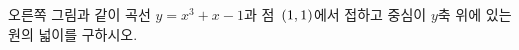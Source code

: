 \noindent\begin{minipage}[t]{0.58\linewidth}\vspace{0pt}\raggedright 오른쪽 그림과 같이 곡선 $y=x^3+x-1$과 점~$(1{,}\mkern3mu\mathopen{}1)$에서 접하고 중심이 $y$축 위에 있는 원의 넓이를 구하시오.\end{minipage}\hfill\begin{minipage}[t]{0.4\linewidth}\vspace{0pt}\centering \resizebox{\ifdim\width>\linewidth\linewidth\else\width\fi}{!}{}\end{minipage}\par
